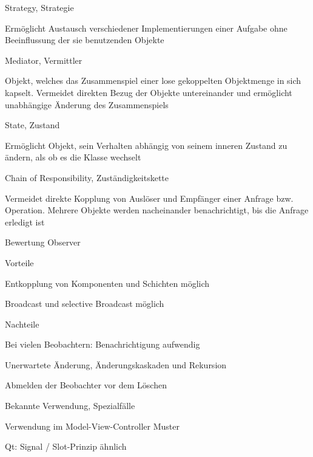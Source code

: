 \documentclass[a4paper]{article}
\begin{document}
\begin{multicols}{3}
\begin{itemize*}
\begin{itemize*}
          \end{itemize*}
    \item Strategy, Strategie
          \begin{itemize*}
            \item Ermöglicht Austausch verschiedener Implementierungen einer Aufgabe ohne Beeinflussung der sie benutzenden Objekte
          \end{itemize*}
    \item Mediator, Vermittler
          \begin{itemize*}
            \item Objekt, welches das Zusammenspiel einer lose gekoppelten Objektmenge in sich kapselt. Vermeidet direkten Bezug der Objekte untereinander und ermöglicht unabhängige Änderung des Zusammenspiels
          \end{itemize*}
    \item State, Zustand
          \begin{itemize*}
            \item Ermöglicht Objekt, sein Verhalten abhängig von seinem inneren Zustand zu ändern, als ob es die Klasse wechselt
          \end{itemize*}
    \item Chain of Responsibility, Zuständigkeitskette
          \begin{itemize*}
            \item Vermeidet direkte Kopplung von Auslöser und Empfänger einer Anfrage bzw. Operation. Mehrere Objekte werden nacheinander benachrichtigt, bis die Anfrage erledigt ist
          \end{itemize*}
  \end{itemize*}

  Bewertung Observer
  \begin{itemize*}
    \item Vorteile
          \begin{itemize*}
            \item Entkopplung von Komponenten und Schichten möglich
            \item Broadcast und selective Broadcast möglich
          \end{itemize*}
    \item Nachteile
          \begin{itemize*}
            \item Bei vielen Beobachtern: Benachrichtigung aufwendig
            \item Unerwartete Änderung, Änderungskaskaden und Rekursion
            \item Abmelden der Beobachter vor dem Löschen
          \end{itemize*}
    \item Bekannte Verwendung, Spezialfälle
          \begin{itemize*}
            \item Verwendung im Model-View-Controller Muster
            \item Qt: Signal / Slot-Prinzip ähnlich
          \end{itemize*}
  \end{itemize*}


\end{multicols}
\end{document}
